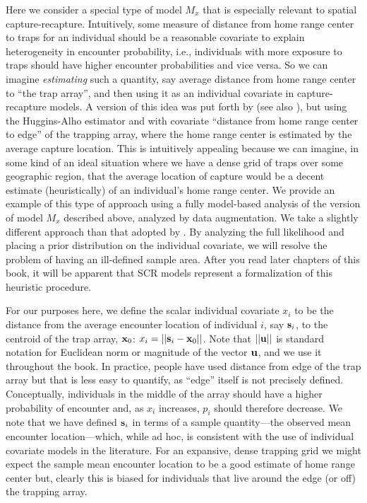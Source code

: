 Here we consider a special type of model $M_{x}$ that is
especially relevant to spatial capture-recapture.  Intuitively, some
measure of distance from home range center to traps for an individual
should be a reasonable covariate to explain heterogeneity in encounter
probability, i.e., individuals with more exposure to traps should have
higher encounter probabilities and vice versa. So we can imagine {\it
  estimating} such a quantity, say average distance from home range
center to ``the trap array'', and then using it as an individual
covariate in capture-recapture models.  A version of this idea was put
forth by \citet{boulanger_mclellan:2001} (see also \citet{ivan:2012}),
but using the Huggins-Alho estimator and with covariate ``distance
from home range center to edge'' of the trapping array, where the home
range center is estimated by the average capture location.  This is
intuitively appealing because we can imagine, in some kind of an ideal
situation where we have a dense grid of traps over some geographic
region, that the average location of capture would be a decent
estimate (heuristically) of an individual's home range center.  We
provide an example of this type of approach
using a fully model-based analysis of the version of model $M_{x}$  
 described above, 
analyzed by data augmentation. We take a slightly different approach
than that adopted by \citet{boulanger_mclellan:2001}. By analyzing the
full likelihood and placing a prior distribution on the individual
covariate, we will resolve the problem of having an ill-defined
sample area.  After you read later chapters of this book, it will be
apparent that SCR models represent a formalization of this heuristic
procedure.



For our purposes here, we define the scalar individual covariate
$x_{i}$ to be the distance from the average encounter location of
individual $i$, say ${\bf s}_{i}$, to the centroid of the trap array,
${\bf x}_{0}$: $x_{i} = ||{\bf s}_{i} - {\bf x}_{0}||$.  Note that $||
{\bf u} ||$ is standard notation for Euclidean norm or magnitude of
the vector ${\bf u}$, and we use it throughout the book.  In practice,
people have used distance from edge of the trap array but that is less
easy to quantify, as ``edge'' itself is not precisely defined.
Conceptually, individuals in the middle of the array should have a
higher probability of encounter and, as $x_{i}$ increases, $p_{i}$
should therefore decrease. We note that we have defined ${\bf s}_{i}$
in terms of a sample quantity---the observed mean encounter
location---which, while ad hoc, is consistent with the use of
individual covariate models in the literature.  For an expansive,
dense trapping grid we might expect the sample mean encounter location
to be a good estimate of home range center but, clearly this is biased
for individuals that live around the edge (or off) the trapping array.


